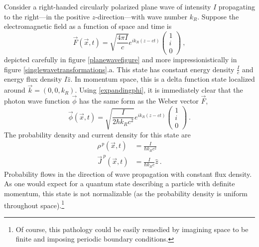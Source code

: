 \documentclass[12pt,secnumarabic,amsmath,amssymb,balancelastpage,nofootinbib]{article}
\begin{document}
Consider a right-handed circularly polarized plane wave of intensity $I$ propagating to the right---in the positive $z$-direction---with wave number $k_R$.  Suppose the electromagnetic field as a function of space and time is
\begin{equation}
\vec{F}(\vec{x},t) = \sqrt{\frac{4 \pi I}{c}} e^{i k_R (z-ct)}
\begin{pmatrix}
1 \\
i \\
0
\end{pmatrix}
\ ,
\label{simpleplanewavefield}
\end{equation}
depicted carefully in figure \ref{planewavefigure} and more impressionistically in figure \ref{singlewavetransformations}.a.  This state has constant energy density $\frac{I}{c}$ and energy flux density $I\hat{z}$. In momentum space, this is a delta function state localized around $\vec{k}=(0,0,k_R)$.  Using \eqref{expandingphi}, it is immediately clear that the photon wave function $\vec{\phi}$ has the same form as the Weber vector $\vec{F}$,
\begin{equation}
\vec{\phi}(\vec{x},t) = \sqrt{\frac{I}{2 \hbar k_R c^2}} e^{i k_R (z-ct)}
\begin{pmatrix}
1 \\
i \\
0
\end{pmatrix}
\ .
\label{simpleplanewavestate}
\end{equation}
The probability density and current density for this state are
\begin{align}
\rho^{\,p}(\vec{x},t)&=\frac{I}{\hbar k_R c^2}
\nonumber
\\
\vec{J}^{\:p}(\vec{x},t)&=\frac{I}{\hbar k_R c}\hat{z}
\ .
\label{probflowplanewave}
\end{align}
Probability flows in the direction of wave propagation with constant flux density.  As one would expect for a quantum state describing a particle with definite momentum, this state is not normalizable (as the probability density is uniform throughout space).\footnote{Of course, this pathology could be easily remedied by imagining space to be finite and imposing periodic boundary conditions.}
\end{document}
